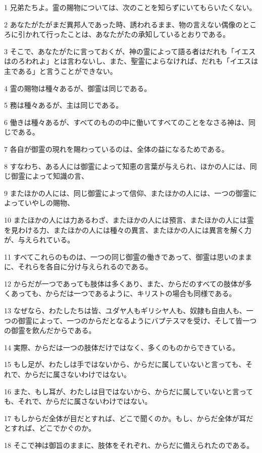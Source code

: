 \par 1 兄弟たちよ。霊の賜物については、次のことを知らずにいてもらいたくない。
\par 2 あなたがたがまだ異邦人であった時、誘われるまま、物の言えない偶像のところに引かれて行ったことは、あなたがたの承知しているとおりである。
\par 3 そこで、あなたがたに言っておくが、神の霊によって語る者はだれも「イエスはのろわれよ」とは言わないし、また、聖霊によらなければ、だれも「イエスは主である」と言うことができない。
\par 4 霊の賜物は種々あるが、御霊は同じである。
\par 5 務は種々あるが、主は同じである。
\par 6 働きは種々あるが、すべてのものの中に働いてすべてのことをなさる神は、同じである。
\par 7 各自が御霊の現れを賜わっているのは、全体の益になるためである。
\par 8 すなわち、ある人には御霊によって知恵の言葉が与えられ、ほかの人には、同じ御霊によって知識の言、
\par 9 またほかの人には、同じ御霊によって信仰、またほかの人には、一つの御霊によっていやしの賜物、
\par 10 またほかの人には力あるわざ、またほかの人には預言、またほかの人には霊を見わける力、またほかの人には種々の異言、またほかの人には異言を解く力が、与えられている。
\par 11 すべてこれらのものは、一つの同じ御霊の働きであって、御霊は思いのままに、それらを各自に分け与えられるのである。
\par 12 からだが一つであっても肢体は多くあり、また、からだのすべての肢体が多くあっても、からだは一つであるように、キリストの場合も同様である。
\par 13 なぜなら、わたしたちは皆、ユダヤ人もギリシヤ人も、奴隷も自由人も、一つの御霊によって、一つのからだとなるようにバプテスマを受け、そして皆一つの御霊を飲んだからである。
\par 14 実際、からだは一つの肢体だけではなく、多くのものからできている。
\par 15 もし足が、わたしは手ではないから、からだに属していないと言っても、それで、からだに属さないわけではない。
\par 16 また、もし耳が、わたしは目ではないから、からだに属していないと言っても、それで、からだに属さないわけではない。
\par 17 もしからだ全体が目だとすれば、どこで聞くのか。もし、からだ全体が耳だとすれば、どこでかぐのか。
\par 18 そこで神は御旨のままに、肢体をそれぞれ、からだに備えられたのである。
